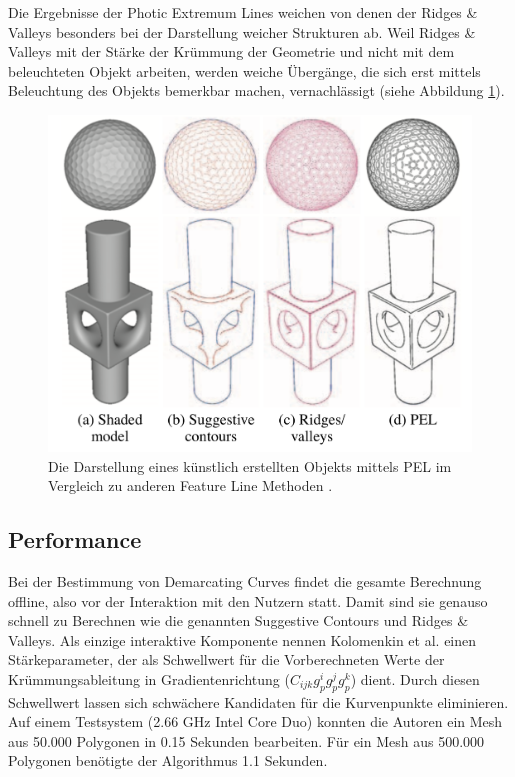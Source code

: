 \documentclass{paperStyle}
\begin{document}
Die Ergebnisse der Photic Extremum Lines weichen von denen der Ridges \& Valleys besonders bei der Darstellung weicher Strukturen ab.
Weil Ridges \& Valleys mit der Stärke der Krümmung der Geometrie und nicht mit dem beleuchteten Objekt arbeiten, werden weiche Übergänge, die sich erst mittels Beleuchtung des Objekts bemerkbar machen, vernachlässigt (siehe Abbildung \ref{vglpel2}). 
\begin{figure}
	\centering
		\includegraphics[width=0.9\linewidth]{vglpel2.png}
	\caption{Die Darstellung eines künstlich erstellten Objekts mittels PEL im Vergleich zu anderen Feature Line Methoden \cite{Xie2007}.}
	\label{vglpel2}
\end{figure}
\subsection{Performance}
Bei der Bestimmung von Demarcating Curves findet die gesamte Berechnung offline, also vor der Interaktion mit den Nutzern statt. Damit sind sie genauso schnell zu Berechnen wie die genannten Suggestive Contours und Ridges \& Valleys. Als einzige interaktive Komponente nennen Kolomenkin et al. \cite{Demarcating} einen Stärkeparameter, der als Schwellwert für die Vorberechneten Werte der Krümmungsableitung in Gradientenrichtung ($C_{ijk}g_p^ig_p^jg_p^k$) dient. Durch diesen Schwellwert lassen sich schwächere Kandidaten für die Kurvenpunkte eliminieren. Auf einem Testsystem (2.66 GHz Intel Core Duo) konnten die Autoren ein Mesh aus 50.000 Polygonen in 0.15 Sekunden bearbeiten. Für ein Mesh aus 500.000 Polygonen benötigte der Algorithmus 1.1 Sekunden. 
\end{document}
